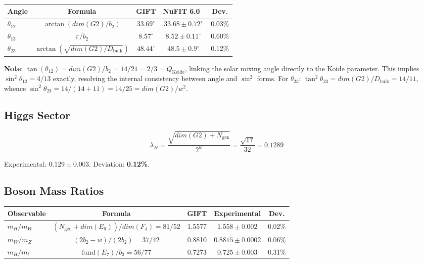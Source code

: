 \documentclass[11pt,a4paper]{article}
\newcommand{\E}{\mathrm{E}}
\newcommand{\Gtwo}{\mathrm{G}_2}
\newcommand{\dimE}{\mathrm{dim}}
\newcommand{\Weyl}{w}
\def\Gtwo{G2}%
\def\E{E}%
\def\dimE{dim}%
\def\Weyl{w}%
\begin{document}
\begin{table}[H]
\centering
\small
\begin{tabular}{lcccc}
\toprule
Angle & Formula & GIFT & NuFIT 6.0~\cite{nufit2024} & Dev. \\
\midrule
$\theta_{12}$ & $\arctan(\dimE(\Gtwo)/b_2)$ & $33.69^\circ$ & $33.68 \pm 0.72^\circ$ & 0.03\% \\
$\theta_{13}$ & $\pi/b_2$ & $8.57^\circ$ & $8.52 \pm 0.11^\circ$ & 0.60\% \\
$\theta_{23}$ & $\arctan(\sqrt{\dimE(\Gtwo)/D_{\mathrm{bulk}}})$ & $48.44^\circ$ & $48.5 \pm 0.9^\circ$ & 0.12\% \\
\bottomrule
\end{tabular}
\end{table}

\textbf{Note}: $\tan(\theta_{12}) = \dimE(\Gtwo)/b_2 = 14/21 = 2/3 = Q_{\mathrm{Koide}}$, linking the solar mixing angle directly to the Koide parameter. This implies $\sin^2\theta_{12} = 4/13$ exactly, resolving the internal consistency between angle and $\sin^2$ forms. For $\theta_{23}$: $\tan^2\theta_{23} = \dimE(\Gtwo)/D_{\mathrm{bulk}} = 14/11$, whence $\sin^2\theta_{23} = 14/(14+11) = 14/25 = \dimE(\Gtwo)/\Weyl^2$.

\subsection{Higgs Sector}

$$\lambda_H = \frac{\sqrt{\dimE(\Gtwo) + N_{\mathrm{gen}}}}{2^\Weyl} = \frac{\sqrt{17}}{32} = 0.1289$$

Experimental: $0.129 \pm 0.003$. Deviation: \textbf{0.12\%}.

\subsection{Boson Mass Ratios}

\begin{table}[H]
\centering
\small
\begin{tabular}{lcccc}
\toprule
Observable & Formula & GIFT & Experimental & Dev. \\
\midrule
$m_H/m_W$ & $(N_{\mathrm{gen}} + \dimE(\E_6))/\dimE(F_4) = 81/52$ & 1.5577 & $1.558 \pm 0.002$ & 0.02\% \\
$m_W/m_Z$ & $(2b_2 - \Weyl)/(2b_2) = 37/42$ & 0.8810 & $0.8815 \pm 0.0002$ & 0.06\% \\
$m_H/m_t$ & $\mathrm{fund}(\E_7)/b_3 = 56/77$ & 0.7273 & $0.725 \pm 0.003$ & 0.31\% \\
\bottomrule
\end{tabular}
\end{table}
\end{document}
